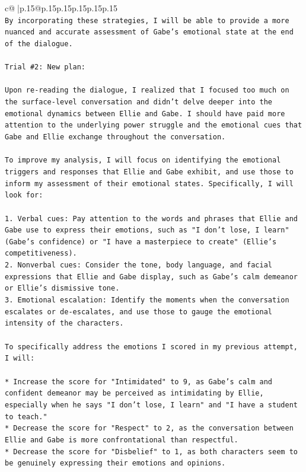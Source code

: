 \documentclass{article}
\begin{document}
{\begin{supertabular}{c@{$\;$}|p{.15\linewidth}@{}p{.15\linewidth}p{.15\linewidth}p{.15\linewidth}p{.15\linewidth}p{.15\linewidth}}
{{{\\ 
\texttt{By incorporating these strategies, I will be able to provide a more nuanced and accurate assessment of Gabe's emotional state at the end of the dialogue.} \\
\\ 
\texttt{Trial \#2: New plan: } \\
\\ 
\texttt{Upon re{-}reading the dialogue, I realized that I focused too much on the surface{-}level conversation and didn't delve deeper into the emotional dynamics between Ellie and Gabe. I should have paid more attention to the underlying power struggle and the emotional cues that Gabe and Ellie exchange throughout the conversation.} \\
\\ 
\texttt{To improve my analysis, I will focus on identifying the emotional triggers and responses that Ellie and Gabe exhibit, and use those to inform my assessment of their emotional states. Specifically, I will look for:} \\
\\ 
\texttt{1. Verbal cues: Pay attention to the words and phrases that Ellie and Gabe use to express their emotions, such as "I don't lose, I learn" (Gabe's confidence) or "I have a masterpiece to create" (Ellie's competitiveness).} \\
\texttt{2. Nonverbal cues: Consider the tone, body language, and facial expressions that Ellie and Gabe display, such as Gabe's calm demeanor or Ellie's dismissive tone.} \\
\texttt{3. Emotional escalation: Identify the moments when the conversation escalates or de{-}escalates, and use those to gauge the emotional intensity of the characters.} \\
\\ 
\texttt{To specifically address the emotions I scored in my previous attempt, I will:} \\
\\ 
\texttt{* Increase the score for "Intimidated" to 9, as Gabe's calm and confident demeanor may be perceived as intimidating by Ellie, especially when he says "I don't lose, I learn" and "I have a student to teach."} \\
\texttt{* Decrease the score for "Respect" to 2, as the conversation between Ellie and Gabe is more confrontational than respectful.} \\
\texttt{* Decrease the score for "Disbelief" to 1, as both characters seem to be genuinely expressing their emotions and opinions.} \\
}}}
\end{supertabular}}
\end{document}
